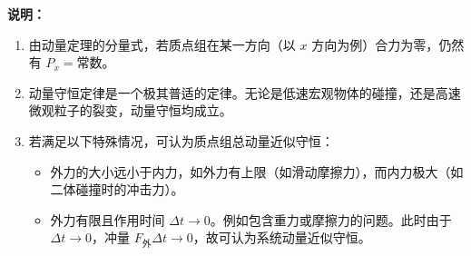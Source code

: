 \noindent\textbf{说明：}
\begin{enumerate}
	\item 由动量定理的分量式，若质点组在某一方向（以 $x$ 方向为例）合力为零，仍然有 $P_x = \text{常数}$。
	\item 动量守恒定律是一个极其普适的定律。无论是低速宏观物体的碰撞，还是高速微观粒子的裂变，动量守恒均成立。
	\item 若满足以下特殊情况，可认为质点组总动量近似守恒：
	      \begin{itemize}
		      \item 外力的大小远小于内力，如外力有上限（如滑动摩擦力），而内力极大（如二体碰撞时的冲击力）。
		      \item 外力有限且作用时间 $\Delta t \to 0$。例如包含重力或摩擦力的问题。此时由于 $\Delta t \to 0$，冲量 $F_{\text{外}}\Delta t \to 0$，故可认为系统动量近似守恒。
	      \end{itemize}
\end{enumerate}
